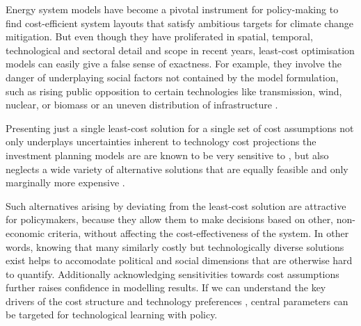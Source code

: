 
Energy system models have become a pivotal instrument for policy-making
to find cost-efficient system layouts that satisfy ambitious targets for climate change mitigation.
But even though they have proliferated in spatial, temporal, technological and sectoral detail and scope in recent years,
least-cost optimisation models can easily give a false sense of exactness.
For example, they involve the danger of underplaying social factors
not contained by the model formulation, such as
rising public opposition to certain technologies like transmission, wind, nuclear, or biomass
or an uneven distribution of infrastructure \cite{mccollum_energy_2020,sasse_regional_2020}.

Presenting just a single least-cost solution for a single set of cost assumptions
not only underplays uncertainties inherent to technology cost projections the
investment planning models are are known to be very sensitive to
\cite{trondle_trade-offs_2020,Pfenninger2014,yue_review_2018,pye_assessing_2018,pye_modelling_2020},
but also neglects a wide variety of alternative solutions
that are equally feasible and only marginally more expensive
\cite{nearoptimal,lombardi_policy_2020,sasse_distributional_2019}.


Such alternatives arising by deviating from the least-cost solution are attractive for policymakers,
because they allow them to make decisions based on other, non-economic criteria,
without affecting the cost-effectiveness of the system.
In other words, knowing that many similarly costly but technologically diverse solutions
exist helps to accomodate political and social dimensions that are otherwise hard to quantify.
Additionally acknowledging sensitivities towards cost assumptions further raises confidence
in modelling results. If we can understand the key drivers of the cost structure and
technology preferences \cite{usher_value_2015,moret_characterization_2017},
central parameters can be targeted for technological learning with policy.



